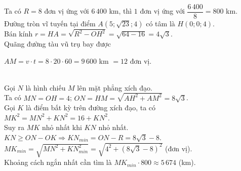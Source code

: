 \begin{bt}
{\begin{center}
		\end{center}
		Ta có $R=8$ đơn vị ứng với $6\,400$ km, thì $1$  đơn vị ứng với $\dfrac{6\,400}{8}= 800$ km.\\
		Đường tròn vĩ tuyến tại điểm $A(5;\sqrt{23};4)$ có tâm là  $H(0;0;4)$.\\
		Bán kính $r  =HA= \sqrt{R^2-OH^2} = \sqrt{64-16} = 4\sqrt{3}$.\\
		Quãng  đường tàu vũ trụ bay được\\
		\centerline {$AM = v \cdot t = 8\cdot 20\cdot 60= 9\,600$ km $= 12$  đơn vị.}\\
		Gọi $N$ là  hình chiếu $M$ lên mặt phẳng xích đạo.\\
		Ta có  $MN=OH=4$; $ON=HM=\sqrt{AH^2+AM^2}= 8\sqrt{3}$.\\
		Gọi $K$ là điểm bất kỳ  trên đường xích đạo, ta có\\
		$MK^2=MN^2+KN^2=16+KN^2$.\\ 
		Suy ra $MK$ nhỏ nhất khi $KN$ nhỏ  nhất.\\
		$KN\ge ON-OK\Rightarrow  KN_{min}=ON-R=8\sqrt{3}-8$.\\
		$MK_{min}=\sqrt{MN^2+KN_{min}^2}=\sqrt{4^2+\left(8\sqrt{3}-8\right)^2}$  (đơn vị).\\
		Khoảng cách ngắn nhất cần tìm là $MK_{min}\cdot 800\approx 5\,674$  (km).
	 }
\end{bt}

